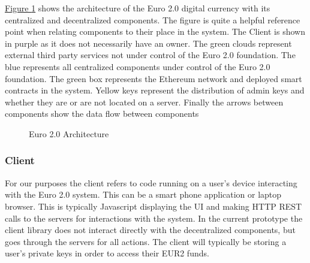 \documentclass[a4paper,12pt]{article} %
\newcommand{\hyperfigureref}[1]{\hyperref[#1]{Figure \ref{#1}}}
\begin{document}
{\hyperfigureref{fig:euro2architecture} shows the architecture of the Euro 2.0 digital currency with its centralized and decentralized components. The figure is quite a helpful reference point when relating components to their place in the system. The Client is shown in purple as it does not necessarily have an owner. The green clouds represent external third party services not under control of the Euro 2.0 foundation. The blue represents all centralized components under control of the Euro 2.0 foundation. The green box represents the Ethereum network and deployed smart contracts in the system. Yellow keys represent the distribution of admin keys and whether they are or are not located on a server. Finally the arrows between components show the data flow between components

\begin{figure}[ht]
    \centering
    \caption{Euro 2.0 Architecture}
    \label{fig:euro2architecture}
\end{figure}

\subsubsection{Client} \label{sssec:3.5:client}
For our purposes the client refers to code running on a user's device interacting with the Euro 2.0 system. This can be a smart phone application or laptop browser. This is typically Javascript displaying the UI and making HTTP REST calls to the servers for interactions with the system. In the current prototype the client library does not interact directly with the decentralized components, but goes through the servers for all actions. The client will typically be storing a user's private keys in order to access their EUR2 funds.

}
\end{document}
